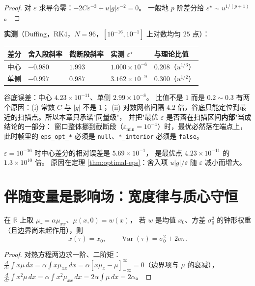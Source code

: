 \begin{proof}
对 $\varepsilon$ 求导令零：$-2C\varepsilon^{-3}+u|g|\varepsilon^{-2}=0$。
一般地 $p$ 阶差分给 $\varepsilon^\star\sim u^{1/(p+1)}$。
\end{proof}

\textbf{实测}（Duffing，RK4，$N=96$，$[10^{-16},10^{-1}]$ 上对数均匀 $25$ 点）：

\begin{center}
\begin{tabular}{lllll}
\hline
差分 & 舍入段斜率 & 截断段斜率 & 实测 $\varepsilon^\star$ & 与理论比值 \\
\hline
中心 & $-0.980$ & $1.993$ & $1.000\times10^{-6}$ & $0.208$（$u^{1/3}$） \\
单侧 & $-0.997$ & $0.987$ & $3.162\times10^{-9}$ & $0.300$（$u^{1/2}$） \\
\hline
\end{tabular}
\end{center}

谷底误差：中心 $4.23\times10^{-11}$、单侧 $2.99\times10^{-8}$。
比值不是 $1$ 而是 $0.2\sim0.3$ 有两个原因：(i) 常数 $C$ 与 $|g|$ 不是 $1$；
(ii) 对数网格间隔 $4.2$ 倍，谷底只能定位到最近的扫描点。所以本章只承诺"同量级"，
并把"最优 $\varepsilon$ 是否落在扫描区间\textbf{内部}"当成结论的一部分：
窗口整体挪到截断段（$\varepsilon_{\min}=10^{-4}$）时，最优必然落在端点上，
此时帧里的 \texttt{eps\_opt\_*} 必须是 \texttt{null}、\texttt{*\_interior} 必须是 \texttt{false}。

\begin{remark}
$\varepsilon=10^{-16}$ 时中心差分的相对误差是 $5.69\times10^{-1}$，
是最优点 $4.23\times10^{-11}$ 的 $1.3\times10^{10}$ 倍。
原因在定理 \ref{thm:optimal-eps}：舍入项 $u|g|/\varepsilon$ 随 $\varepsilon$ 减小而增大。
\end{remark}

\section{伴随变量是影响场：宽度律与质心守恒}

\begin{theorem}[纯扩散下影响场的宽度律]\label{thm:width-law}
在 $\mathbb{R}$ 上取 $\mu_\tau=\alpha\mu_{xx}$、$\mu(x,0)=w(x)$，
若 $w$ 是均值 $x_0$、方差 $\sigma_0^2$ 的钟形权重（且边界尚未起作用），则
\[
\bar x(\tau)=x_0,\qquad \operatorname{Var}(\tau)=\sigma_0^2+2\alpha\tau .
\]
\end{theorem}

\begin{proof}
对热方程两边求一阶、二阶矩：$\frac{d}{d\tau}\int x\mu\,dx=\alpha\int x\mu_{xx}\,dx
=\alpha[x\mu_x-\mu]_{-\infty}^{\infty}=0$（边界项与 $\mu$ 的衰减），
$\frac{d}{d\tau}\int x^2\mu\,dx=\alpha\int x^2\mu_{xx}\,dx=2\alpha\int\mu\,dx=2\alpha$。
\end{proof}

